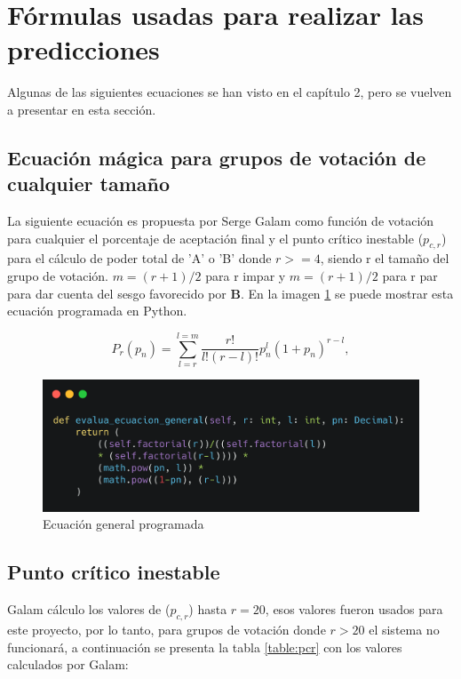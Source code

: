 \clearpage

\section{Fórmulas usadas para realizar las predicciones}
Algunas de las siguientes ecuaciones se han visto en el capítulo 2, pero se vuelven a presentar en esta sección.

\subsection{Ecuación mágica para grupos de votación de cualquier tamaño}
La siguiente ecuación es propuesta por Serge Galam como función de votación para cualquier el porcentaje de aceptación final y el punto crítico inestable ($p_{c,r}$) para el cálculo de poder total de 'A' o 'B' donde $r >= 4$, siendo r el tamaño del grupo de votación. $m = (r + 1)/2$ para r impar y $m = (r + 1)/2$ para r par para dar cuenta del sesgo favorecido por \textbf{B}. En la imagen \ref{graphic:ecuaciongeneral} se puede mostrar esta ecuación programada en Python.

\begin{equation}
    P_{r}(p_{n}) = \sum_{l=r}^{l=m} \frac{r!}{l!(r-l)!}p_{n}^{l}(1+p_{n})^{r-l},
\end{equation}

\begin{figure}[!htb]
    \centering
    \includegraphics[scale=.15]{TT/img/pruebas/ecuaciongeneral.png}
    \caption{Ecuación general programada}
    \label{graphic:ecuaciongeneral}
\end{figure}

\subsection{Punto crítico inestable}
Galam cálculo los valores de ($p_{c,r}$) hasta $r = 20$, esos valores fueron usados para este proyecto, por lo tanto, para grupos de votación donde $r > 20$ el sistema no funcionará, a continuación se presenta la tabla \ref{table:pcr} con los valores calculados por Galam:

